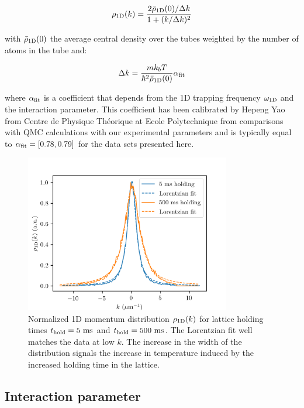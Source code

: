 \begin{equation}
    \rho_{\rm{1D}}(k)=\frac{2 \bar{\rho}_{\rm{1D}}(0)/\Delta k }{1+(k/\Delta k)^2}
\end{equation}

\noindent with $\bar{\rho}_{\rm{1D}}(0)$ the average central density over the tubes weighted by the number
of atoms in the tube and:

\begin{equation}
    \Delta k=\frac{m k_b T}{\hbar^2 \bar{\rho}_{\rm{1D}}(0)} \alpha_{\rm{fit}}
\end{equation}

\noindent where $\alpha_{\rm{fit}}$ is a coefficient that depends from the 1D trapping frequency $\omega_{\rm{1D}}$ and the interaction parameter. This coefficient has been calibrated by Hepeng Yao from Centre de Physique Théorique at Ecole Polytechnique from comparisons with QMC calculations with our experimental parameters and is typically equal to $\alpha_{\rm{fit}} = [0.78,0.79]$ for the data sets presented here. 

\begin{figure}
    \centering
    \includegraphics[width=0.8\textwidth]{Fig/Chapter5/1D_temperature_lorentz.png}
    \caption{Normalized 1D momentum distribution $\rho_{\rm{1D}} (k)$ for lattice holding times $t_{\rm{hold}}=5 \ \rm{ms}$ and $t_{\rm{hold}}=500 \ \rm{ms}$. The Lorentzian fit well matches the data at low $k$. The increase in the width of the distribution signals the increase in temperature induced by the increased holding time in the lattice.}
    \label{fig:1D_temperature}
\end{figure}


\subsection{Interaction parameter}


